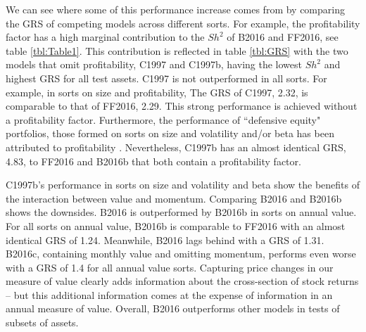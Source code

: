 We can see where some of this performance increase comes from by comparing the GRS of
competing models across different sorts. For example, the profitability factor has a high
marginal contribution to the $Sh^2$ of B2016 and FF2016, see table \ref{tbl:Table1}. This
contribution is reflected in table \ref{tbl:GRS} with the two models that omit
profitability, C1997 and C1997b, having the lowest $Sh^2$ and highest GRS for all test
assets. C1997 is not outperformed in all sorts. For example, in sorts on size and
profitability, The GRS of C1997, 2.32, is comparable to that of FF2016, 2.29. This strong
performance is achieved without a profitability factor. Furthermore, the performance of
``defensive equity" portfolios, those formed on sorts on size and volatility and/or beta
has been attributed to profitability \parencite{novy2014understanding}. Nevertheless,
C1997b has an almost identical GRS, 4.83, to FF2016 and B2016b that both contain a
profitability factor.

C1997b's performance in sorts on size and volatility and beta show the benefits of the
interaction between value and momentum. Comparing B2016 and B2016b shows the downsides.
B2016 is outperformed by B2016b in sorts on annual value. For all sorts on annual value,
B2016b is comparable to FF2016 with an almost identical GRS of 1.24. Meanwhile, B2016 lags
behind with a GRS of 1.31. B2016c, containing monthly value and omitting momentum,
performs even worse with a GRS of 1.4 for all annual value sorts. Capturing price changes
in our measure of value clearly adds information about the cross-section of stock returns
-- but this additional information comes at the expense of information in an annual
measure of value. Overall, B2016 outperforms other models in tests of subsets of assets.
